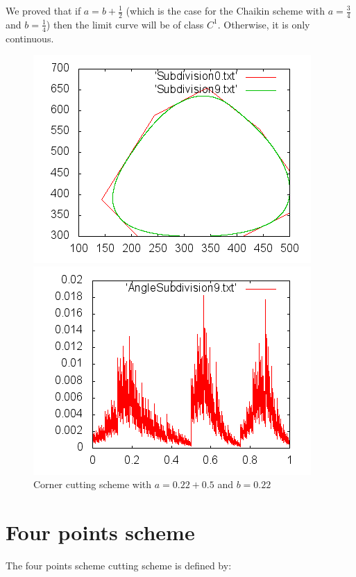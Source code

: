 \documentclass[a4paper,11pt]{article}
\begin{document}
We proved that if $ a = b + \frac{1}{2} $ (which is the case for the Chaikin
scheme with $ a = \frac{3}{4} $ and $ b = \frac{1}{4} $) then the limit curve
will be of class $ C^1 $. Otherwise, it is only continuous.

\begin{figure}[H]
\centering
\begin{minipage}{0.35\paperwidth}
\includegraphics[scale=0.75]{pic/poly1.png}
\end{minipage}
\begin{minipage}{0.35\paperwidth}
\includegraphics[scale=0.75]{pic/angle1.png}
\end{minipage}
\caption{Corner cutting scheme with $ a = 0.22 + 0.5 $ and $ b = 0.22 $}
\end{figure}

\section{Four points scheme}

The four points scheme cutting scheme is defined by:
\end{document}
